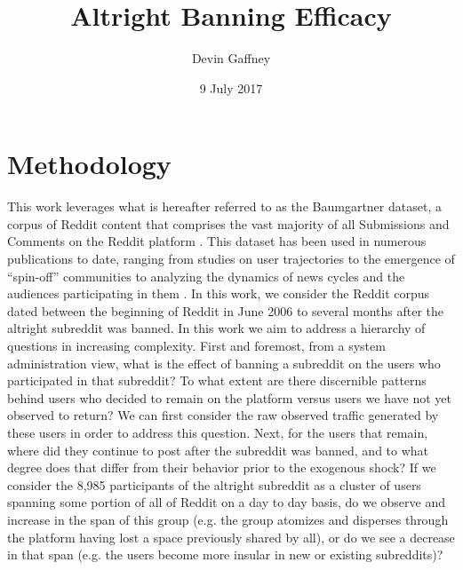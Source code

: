 \documentclass[letterpaper,12pt]{article}
\title{Altright Banning Efficacy}
\date{9 July 2017}
\author{Devin Gaffney}
\begin{document}
\maketitle
\doublespacing

\section{Methodology}

This work leverages what is hereafter referred to as the Baumgartner dataset, a corpus of Reddit content that comprises the vast majority of all Submissions and Comments on the Reddit platform \cite{baumgartner2015dataset}. This dataset has been used in numerous publications to date, ranging from studies on user trajectories \cite{tan2015all,fire2016analyzing} to the emergence of ``spin-off'' communities \cite{hessel2015democrats} to analyzing the dynamics of news cycles and the audiences participating in them \cite{horne2017impact}. In this work, we consider the Reddit corpus dated between the beginning of Reddit in June 2006 to several months after the altright subreddit was banned. In this work we aim to address a hierarchy of questions in increasing complexity. First and foremost, from a system administration view, what is the effect of banning a subreddit on the users who participated in that subreddit? To what extent are there discernible patterns behind users who decided to remain on the platform versus users we have not yet observed to return? We can first consider the raw observed traffic generated by these users in order to address this question. Next, for the users that remain, where did they continue to post after the subreddit was banned, and to what degree does that differ from their behavior prior to the exogenous shock? If we consider the 8,985 participants of the altright subreddit as a cluster of users spanning some portion of all of Reddit on a day to day basis, do we observe and increase in the span of this group (e.g. the group atomizes and disperses through the platform having lost a space previously shared by all), or do we see a decrease in that span (e.g. the users become more insular in new or existing subreddits)? 
\end{document}
